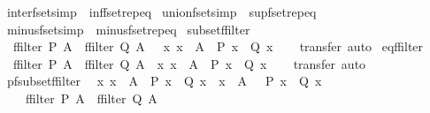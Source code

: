 \begin{isabellebody}
\isamarkupfalse%
\ inter{\isacharunderscore}fset{\isacharbrackleft}simp{\isacharbrackright}\ {\isacharequal}\ inf{\isacharunderscore}fset{\isachardot}rep{\isacharunderscore}eq\isanewline
\isanewline
{}\isamarkupfalse%
\ union{\isacharunderscore}fset{\isacharbrackleft}simp{\isacharbrackright}\ {\isacharequal}\ sup{\isacharunderscore}fset{\isachardot}rep{\isacharunderscore}eq\isanewline
\isanewline
{}\isamarkupfalse%
\ minus{\isacharunderscore}fset{\isacharbrackleft}simp{\isacharbrackright}\ {\isacharequal}\ minus{\isacharunderscore}fset{\isachardot}rep{\isacharunderscore}eq%
\isadelimdocument
%
\endisadelimdocument
%
\isatagdocument
%
\isamarkuptrue%
%
\endisatagdocument
{\isafolddocument}%
%
\isadelimdocument
%
\endisadelimdocument
{}\isamarkupfalse%
\ subset{\isacharunderscore}ffilter{\isacharcolon}\isanewline
\ \ {\isachardoublequoteopen}ffilter\ P\ A\ {\isacharbar}{\isasymsubseteq}{\isacharbar}\ ffilter\ Q\ A\ {\isacharequal}\ {\isacharparenleft}{\isasymforall}\ x{\isachardot}\ x\ {\isacharbar}{\isasymin}{\isacharbar}\ A\ {\isasymlongrightarrow}\ P\ x\ {\isasymlongrightarrow}\ Q\ x{\isacharparenright}{\isachardoublequoteclose}\isanewline
%
\isadelimproof
\ \ %
\endisadelimproof
%
\isatagproof
{}\isamarkupfalse%
\ transfer\ auto%
\endisatagproof
{\isafoldproof}%
%
\isadelimproof
\isanewline
%
\endisadelimproof
\isanewline
{}\isamarkupfalse%
\ eq{\isacharunderscore}ffilter{\isacharcolon}\isanewline
\ \ {\isachardoublequoteopen}{\isacharparenleft}ffilter\ P\ A\ {\isacharequal}\ ffilter\ Q\ A{\isacharparenright}\ {\isacharequal}\ {\isacharparenleft}{\isasymforall}x{\isachardot}\ x\ {\isacharbar}{\isasymin}{\isacharbar}\ A\ {\isasymlongrightarrow}\ P\ x\ {\isacharequal}\ Q\ x{\isacharparenright}{\isachardoublequoteclose}\isanewline
%
\isadelimproof
\ \ %
\endisadelimproof
%
\isatagproof
{}\isamarkupfalse%
\ transfer\ auto%
\endisatagproof
{\isafoldproof}%
%
\isadelimproof
\isanewline
%
\endisadelimproof
\isanewline
{}\isamarkupfalse%
\ pfsubset{\isacharunderscore}ffilter{\isacharcolon}\isanewline
\ \ {\isachardoublequoteopen}{\isacharparenleft}{\isasymAnd}x{\isachardot}\ x\ {\isacharbar}{\isasymin}{\isacharbar}\ A\ {\isasymLongrightarrow}\ P\ x\ {\isasymLongrightarrow}\ Q\ x{\isacharparenright}\ {\isasymLongrightarrow}\ {\isacharparenleft}x\ {\isacharbar}{\isasymin}{\isacharbar}\ A\ {\isasymand}\ {\isasymnot}\ P\ x\ {\isasymand}\ Q\ x{\isacharparenright}\ {\isasymLongrightarrow}\isanewline
\ \ \ \ ffilter\ P\ A\ {\isacharbar}{\isasymsubset}{\isacharbar}\ ffilter\ Q\ A{\isachardoublequoteclose}\isanewline

\end{isabellebody}
